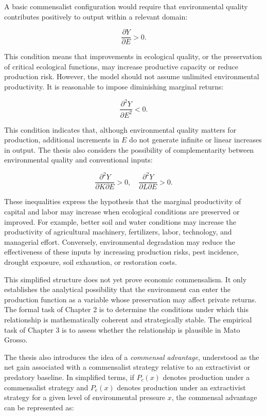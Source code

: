 A basic commensalist configuration would require that environmental quality contributes positively to output within a relevant domain:

\[
\frac{\partial Y}{\partial E} > 0.
\]

This condition means that improvements in ecological quality, or the preservation of critical ecological functions, may increase productive capacity or reduce production risk. However, the model should not assume unlimited environmental productivity. It is reasonable to impose diminishing marginal returns:

\[
\frac{\partial^2 Y}{\partial E^2} < 0.
\]

This condition indicates that, although environmental quality matters for production, additional increments in \(E\) do not generate infinite or linear increases in output. The thesis also considers the possibility of complementarity between environmental quality and conventional inputs:

\[
\frac{\partial^2 Y}{\partial K \partial E} > 0,
\quad
\frac{\partial^2 Y}{\partial L \partial E} > 0.
\]

These inequalities express the hypothesis that the marginal productivity of capital and labor may increase when ecological conditions are preserved or improved. For example, better soil and water conditions may increase the productivity of agricultural machinery, fertilizers, labor, technology, and managerial effort. Conversely, environmental degradation may reduce the effectiveness of these inputs by increasing production risks, pest incidence, drought exposure, soil exhaustion, or restoration costs.

This simplified structure does not yet prove economic commensalism. It only establishes the analytical possibility that the environment can enter the production function as a variable whose preservation may affect private returns. The formal task of Chapter 2 is to determine the conditions under which this relationship is mathematically coherent and strategically stable. The empirical task of Chapter 3 is to assess whether the relationship is plausible in Mato Grosso.

The thesis also introduces the idea of a \emph{commensal advantage}, understood as the net gain associated with a commensalist strategy relative to an extractivist or predatory baseline. In simplified terms, if \(P_c(x)\) denotes production under a commensalist strategy and \(P_e(x)\) denotes production under an extractivist strategy for a given level of environmental pressure \(x\), the commensal advantage can be represented as:

